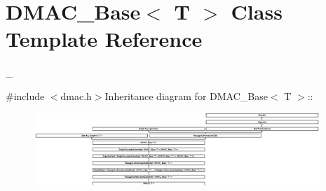 \hypertarget{class_d_m_a_c___base}{
\section{DMAC\_\-Base$<$ T $>$ Class Template Reference}
\label{class_d_m_a_c___base}
}


\_\-  


{\ttfamily \#include $<$dmac.h$>$}Inheritance diagram for DMAC\_\-Base$<$ T $>$::\begin{figure}[H]
\begin{center}
\leavevmode
\includegraphics[height=2.72687cm]{class_d_m_a_c___base}
\end{center}
\end{figure}
